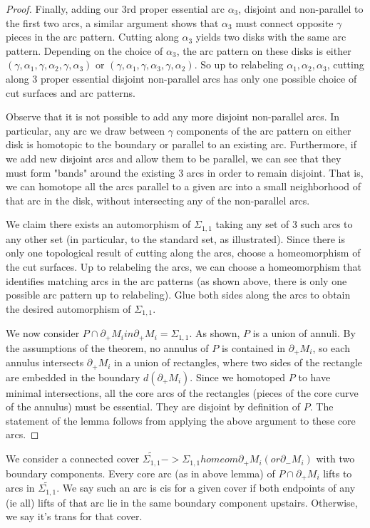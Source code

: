 \documentclass[12pt]{amsart}
\theoremstyle{definition}
\newcommand{\bd}{\partial}
\newcommand{\Si}{\Sigma}
\begin{document}
\begin{proof}
Finally, adding our 3rd proper essential arc $\alpha_3$, disjoint and non-parallel
to the first two arcs, a similar argument shows that $\alpha_3$ must connect
opposite $\gamma$ pieces in the arc pattern. Cutting along $\alpha_3$ yields two disks
with the same arc pattern. Depending on the choice of $\alpha_3$, the arc pattern
on these disks is either $(\gamma,\alpha_1,\gamma,\alpha_2,\gamma,\alpha_3)$ or
$(\gamma,\alpha_1,\gamma,\alpha_3,\gamma,\alpha_2)$. So up to relabeling
$\alpha_1,\alpha_2,\alpha_3$, cutting along 3 proper essential disjoint non-parallel
arcs has only one possible choice of cut surfaces and arc patterns.

Observe that it is not possible to add any more disjoint non-parallel arcs. In
particular, any arc we draw between $\gamma$ components of the arc pattern on
either disk is homotopic to the boundary or parallel to an existing arc.
Furthermore, if we add new disjoint arcs and allow them to be parallel, we can
see that they must form "bands" around the existing 3 arcs in order to remain
disjoint. That is, we can homotope all the arcs parallel to a given arc into
a small neighborhood of that arc in the disk, without intersecting any of the
non-parallel arcs.

We claim there exists an automorphism of $\Si_{1,1}$ taking any set of 3 such arcs to
any other set (in particular, to the standard set, as illustrated). Since there
is only one topological result of cutting along the arcs, choose
a homeomorphism of the cut surfaces. Up to relabeling the arcs, we can choose
a homeomorphism that identifies matching arcs in the arc patterns (as shown
above, there is only one possible arc pattern up to relabeling). Glue both
sides along the arcs to obtain the desired automorphism of $\Si_{1,1}$.

We now consider $P \cap \bd_+M_i in \bd_+M_i = \Si_{1,1}$. As shown, $P$ is a union of
annuli. By the assumptions of the theorem, no annulus of $P$ is contained in
$\bd_+M_i$, so each annulus intersects $\bd_+M_i$ in a union of rectangles, where two sides
of the rectangle are embedded in the boundary $d(\bd_+M_i)$. Since we homotoped $P$ to
have minimal intersections, all the core arcs of the rectangles (pieces of the
core curve of the annulus) must be essential. They are disjoint by definition
of $P$. The statement of the lemma follows from applying the above argument to
these core arcs.

\end{proof}

We consider a connected cover $\widetilde{\Si_{1,1}} -> \Si_{1,1} homeom \bd_+M_i (or
\bd_-M_i)$ with two
boundary components. Every core arc (as in above lemma) of $P \cap \bd_+M_i$
lifts to arcs in $\widetilde{\Si_{1,1}}$. We say such an arc is cis for a given cover if
both endpoints of any (ie all) lifts of that arc lie in the same boundary
component upstairs. Otherwise, we say it's trans for that cover.
\end{document}
